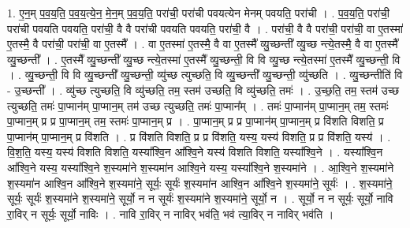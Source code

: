 \documentclass[17pt]{extarticle}
\begin{document}
1. ए॒न॒म् प॒व॒य॒ति॒ प॒व॒य॒त्ये॒न॒ मे॒न॒म् प॒व॒य॒ति॒ परा॑ची॒ परा॑ची पवयत्येन मेनम् पवयति॒ परा॑ची । . प॒व॒य॒ति॒ परा॑ची॒ परा॑ची पवयति पवयति॒ परा॑ची॒ वै वै परा॑ची पवयति पवयति॒ परा॑ची॒ वै । . परा॑ची॒ वै वै परा॑ची॒ परा॑ची॒ वा ए॒तस्मा॑ ए॒तस्मै॒ वै परा॑ची॒ परा॑ची॒ वा ए॒तस्मै᳚ । . वा ए॒तस्मा॑ ए॒तस्मै॒ वै वा ए॒तस्मै᳚ व्यु॒च्छन्ती᳚ व्यु॒च्छ न्त्ये॒तस्मै॒ वै वा ए॒तस्मै᳚ व्यु॒च्छन्ती᳚ । . ए॒तस्मै᳚ व्यु॒च्छन्ती᳚ व्यु॒च्छ न्त्ये॒तस्मा॑ ए॒तस्मै᳚ व्यु॒च्छन्ती॒ वि वि व्यु॒च्छ न्त्ये॒तस्मा॑ ए॒तस्मै᳚ व्यु॒च्छन्ती॒ वि । . व्यु॒च्छन्ती॒ वि वि व्यु॒च्छन्ती᳚ व्यु॒च्छन्ती॒ व्यु॑च्छ त्युच्छति॒ वि व्यु॒च्छन्ती᳚ व्यु॒च्छन्ती॒ व्यु॑च्छति । . व्यु॒च्छन्तीति॑ वि - उ॒च्छन्ती᳚ । . व्यु॑च्छ त्युच्छति॒ वि व्यु॑च्छति॒ तम॒ स्तम॑ उच्छति॒ वि व्यु॑च्छति॒ तमः॑ । . उ॒च्छ॒ति॒ तम॒ स्तम॑ उच्छ त्युच्छति॒ तमः॑ पा॒प्मान॑म् पा॒प्मान॒म् तम॑ उच्छ त्युच्छति॒ तमः॑ पा॒प्मान᳚म् । . तमः॑ पा॒प्मान॑म् पा॒प्मान॒म् तम॒ स्तमः॑ पा॒प्मान॒म् प्र प्र पा॒प्मान॒म् तम॒ स्तमः॑ पा॒प्मान॒म् प्र । . पा॒प्मान॒म् प्र प्र पा॒प्मान॑म् पा॒प्मान॒म् प्र वि॑शति विशति॒ प्र पा॒प्मान॑म् पा॒प्मान॒म् प्र वि॑शति । . प्र वि॑शति विशति॒ प्र प्र वि॑शति॒ यस्य॒ यस्य॑ विशति॒ प्र प्र वि॑शति॒ यस्य॑ । . वि॒श॒ति॒ यस्य॒ यस्य॑ विशति विशति॒ यस्या᳚श्वि॒न आ᳚श्वि॒ने यस्य॑ विशति विशति॒ यस्या᳚श्वि॒ने । . यस्या᳚श्वि॒न आ᳚श्वि॒ने यस्य॒ यस्या᳚श्वि॒ने श॒स्यमा॑ने श॒स्यमा॑न आश्वि॒ने यस्य॒ यस्या᳚श्वि॒ने श॒स्यमा॑ने । . आ॒श्वि॒ने श॒स्यमा॑ने श॒स्यमा॑न आश्वि॒न आ᳚श्वि॒ने श॒स्यमा॑ने॒ सूर्यः॒ सूर्यः॑ श॒स्यमा॑न आश्वि॒न आ᳚श्वि॒ने श॒स्यमा॑ने॒ सूर्यः॑ । . श॒स्यमा॑ने॒ सूर्यः॒ सूर्यः॑ श॒स्यमा॑ने श॒स्यमा॑ने॒ सूर्यो॒ न न सूर्यः॑ श॒स्यमा॑ने श॒स्यमा॑ने॒ सूर्यो॒ न । . सूर्यो॒ न न सूर्यः॒ सूर्यो॒ नावि रा॒विर् न सूर्यः॒ सूर्यो॒ नाविः । . नावि रा॒विर् न नाविर् भव॑ति॒ भव॑ त्या॒विर् न नाविर् भव॑ति । \newline
\end{document}
